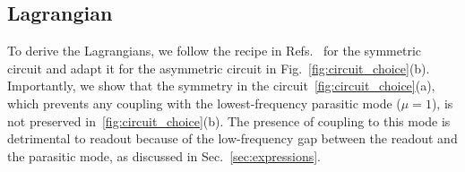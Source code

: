 \documentclass[%
reprint,
superscriptaddress,
 amsmath,amssymb,
 aps,
 prx,
longbibliography,
floatfix,
]{revtex4-2}
\begin{document}
\subsection{Lagrangian}

To derive the Lagrangians, we follow the recipe in Refs.~\cite{viola2015collective,ferguson2013symmetries} for the symmetric circuit and adapt it for the asymmetric circuit in Fig.~\ref{fig:circuit_choice}(b). Importantly, we show that the symmetry in the circuit~\ref{fig:circuit_choice}(a), which prevents any coupling with the lowest-frequency parasitic mode ($\mu=1$), is not preserved in~\ref{fig:circuit_choice}(b). The presence of coupling to this mode is detrimental to readout because of the low-frequency gap between the readout and the parasitic mode, as discussed in Sec.~\ref{sec:expressions}.
\end{document}
